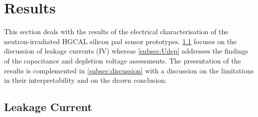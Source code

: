 \section{Results}
\label{sec:results}
This section deals with the results of the electrical characterisation of the neutron-irradiated HGCAL silicon pad sensor prototypes. 
\ref{subsec:leakagecurrents} focuses on the discussion of leakage currents (IV) whereas \ref{subsec:Udep} addresses the findings of the capacitance and depletion voltage assessments. 
The presentation of the results is complemented in \ref{subsec:discussion} with a discussion on the limitations in their interpretability and on the drawn conclusion.

\subsection{Leakage Current}
\label{subsec:leakagecurrents}
